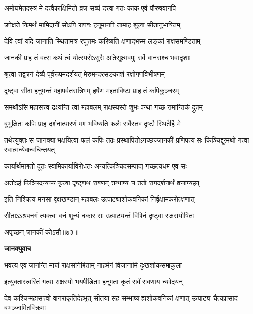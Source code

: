 \twolineshloka
{अमोघमेतदस्त्रं मे दत्वैकाक्षिमितो व्रज}
{सव्यं दत्त्वा गतः काक एवं पौरुषवानपि} %

\twolineshloka
{उपेक्षते किमर्थं मामिदानीं सोऽपि राघवः}
{हनूमानपि तामाह श्रुत्वा सीतानुभाषितम्} %

\twolineshloka
{देवि त्वां यदि जानाति स्थितामत्र रघूत्तमः}
{करिष्यति क्षणाद्भस्म लङ्कां राक्षसमण्डिताम्} %

\twolineshloka
{जानकी प्राह तं वत्स कथं त्वं योत्स्यसेऽसुरैः}
{अतिसूक्ष्मवपुः सर्वे वानराश्च भवादृशाः} %

\twolineshloka
{श्रुत्वा तद्वचनं देव्यै पूर्वरूपमदर्शयत्}
{मेरुमन्दरसङ्काशं रक्षोगणविभीषणम्} %

\twolineshloka
{दृष्ट्वा सीता हनुमन्तं महापर्वतसन्निभम्}
{हर्षेण महताविष्टा प्राह तं कपिकुञ्जरम्} %

\twolineshloka
{समर्थोऽसि महासत्त्व द्रक्ष्यन्ति त्वां महाबलम्}
{राक्षस्यस्ते शुभः पन्था गच्छ रामान्तिकं द्रुतम्} %

\twolineshloka
{बुभुक्षितः कपिः प्राह दर्शनात्पारणं मम}
{भविष्यति फलैः सर्वैस्तव दृष्टौ स्थितैर्हि मे} %

\threelineshloka
{तथेत्युक्तः स जानक्या भक्षयित्वा फलं कपिः}
{ततः प्रस्थापितोऽगच्छज्जानकीं प्रणिपत्य सः}
{किञ्चिद्दूरमथो गत्वा स्वात्मन्येवान्वचिन्तयत्} %

\twolineshloka
{कार्यार्थमागतो दूतः स्वामिकार्याविरोधतः}
{अन्यत्किञ्चिदसम्पाद्य गच्छत्यधम एव सः} %

\twolineshloka
{अतोऽहं किञ्चिदन्यच्च कृत्वा दृष्ट्वाथ रावणम्}
{सम्भाष्य च ततो रामदर्शनार्थं व्रजाम्यहम्} %

\twolineshloka
{इति निश्चित्य मनसा वृक्षखण्डान् महाबलः}
{उत्पाट्याशोकवनिकां निर्वृक्षामकरोत्क्षणात्} %

\twolineshloka
{सीताऽऽश्रयनगं त्यक्त्वा वनं शून्यं चकार सः}
{उत्पाटयन्तं विपिनं दृष्ट्वा राक्षसयोषितः} %

{अपृच्छन् जानकीं कोऽसौ॥७३॥} %


\textbf{जानक्युवाच}

\twolineshloka
{भवत्य एव जानन्ति मायां राक्षसनिर्मिताम्}
{नाहमेनं विजानामि दुःखशोकसमाकुला} %

\twolineshloka
{इत्युक्तास्त्वरितं गत्वा राक्षस्यो भयपीडिताः}
{हनूमता कृतं सर्वं रावणाय न्यवेदयन्} %

\threelineshloka
{देव कश्चिन्महासत्त्वो वानराकृतिदेहभृत्}
{सीतया सह सम्भाष्य ह्यशोकवनिकां क्षणात्}
{उत्पाट्य चैत्यप्रासादं बभञ्जामितविक्रमः} %

